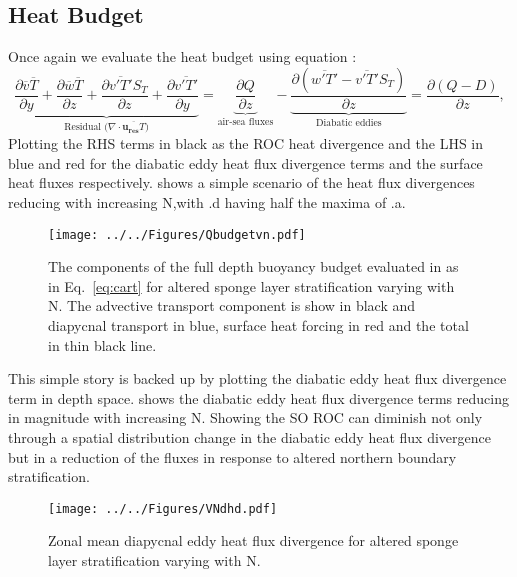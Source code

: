 \subsection*{Heat Budget}
Once again we evaluate the heat budget using equation :
\begin{equation*}
\underbrace{\frac{\partial \overline{v}\overline{T}}{\partial y } + \frac{\partial\overline{w} \overline{T}}{\partial z } + \frac{\partial \overline{v'T'}S_T}{\partial z } + \frac{\partial \overline{v'T'}}{\partial y }}_\text{Residual ($\nabla \cdot \overline{\textbf{u$_{\textbf{res}}$}T}$)} = \underbrace{\frac{\partial Q}{\partial z}}_\text{air-sea fluxes} - \underbrace{\frac{\partial \left( \overline{w'T'}-\overline{v'T'}S_T \right)}{\partial z }}_\text{Diabatic eddies} = \frac{\partial (Q - D)}{\partial z},
\end{equation*}
Plotting the RHS terms in black as the ROC heat divergence and the LHS in blue and red for the diabatic eddy heat flux divergence terms and the surface heat fluxes respectively.  shows a simple scenario of the heat flux divergences reducing with increasing N,with .d having half the maxima of .a.
\begin{figure}[H]
\noindent \texttt{[image: ../../Figures/Qbudgetvn.pdf]} 
\caption{The components of the full depth buoyancy budget evaluated in as in Eq.~\ref{eq:cart} for altered sponge layer stratification varying with N. The advective transport component is show in black and diapycnal transport in blue, surface heat forcing in red and the total in thin black line.}
\label{fig:QVN}
\end{figure}
This simple story is backed up by plotting the diabatic eddy heat flux divergence term in depth space.  shows the diabatic eddy heat flux divergence terms reducing in magnitude with increasing N. Showing the SO ROC can diminish not only through a spatial distribution change in the diabatic eddy heat flux divergence but in a reduction of the fluxes in response to altered northern boundary stratification.
\begin{figure}[H]
\noindent \texttt{[image: ../../Figures/VNdhd.pdf]} 
\caption{Zonal mean diapycnal eddy heat flux divergence for altered sponge layer stratification varying with N. }
\label{fig:VNdhd}
\end{figure}
